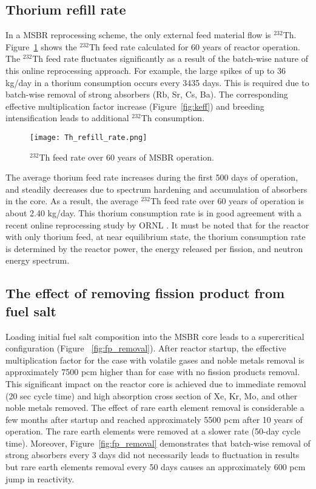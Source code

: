 \subsection{Thorium refill rate}
In a \gls{MSBR} reprocessing scheme, the only external feed material flow  is 
$^{232}$Th. Figure~\ref{fig:th_refill} shows the $^{232}$Th feed rate 
calculated for 60 years of reactor operation. The $^{232}$Th feed rate 
fluctuates significantly as a result of the batch-wise nature of this online 
reprocessing approach. For example, the large spikes of up to 36 kg/day in a 
thorium consumption occurs every 3435 days. This is required due to batch-wise 
removal of strong absorbers (Rb, Sr, Cs, Ba). The corresponding effective 
multiplication factor increase (Figure~\ref{fig:keff}) and breeding 
intensification leads to additional $^{232}$Th consumption.  
\begin{figure}[ht!] %
  \texttt{[image: Th\_refill\_rate.png]} \caption{$^{232}$Th 
  feed rate over 60 years of \gls{MSBR} operation.}
  \label{fig:th_refill}
\end{figure}

The average thorium feed rate increases during the first 500 days of operation, 
and steadily decreases due to spectrum hardening and accumulation of 
absorbers in the core. As a result, the average $^{232}$Th feed rate over 60 
years of operation is about 2.40 kg/day. This thorium consumption rate is in 
good agreement with a recent online reprocessing study by \gls{ORNL} 
\cite{betzler_molten_2017}. It must be noted that for the reactor with only 
thorium feed, at near equilibrium state, the thorium consumption rate is 
determined by the reactor power, the energy released per fission, and 
neutron energy spectrum.

\subsection{The effect of removing fission product from fuel salt}
Loading initial fuel salt composition into the \gls{MSBR} core leads to a 
supercritical configuration (Figure ~\ref{fig:fp_removal}). After reactor 
startup, the effective multiplication factor for the case with volatile gases 
and noble metals removal is approximately 7500 pcm  higher than for case with 
no fission products removal. This significant impact on the reactor core is
achieved due to immediate removal (20 sec cycle time) and high absorption cross 
section of Xe, Kr, Mo, and other noble metals removed. The effect of rare earth 
element removal is considerable a few months after startup and reached 
approximately 5500 pcm after 10 years of operation. The rare earth elements were 
removed at a slower rate (50-day cycle time). Moreover, 
Figure~\ref{fig:fp_removal} demonstrates that batch-wise removal of strong 
absorbers every 3 days did not necessarily leads to fluctuation in results 
but rare earth elements removal every 50 days causes an approximately 600 pcm jump 
in reactivity.


